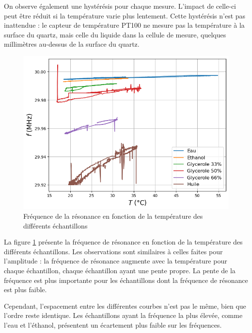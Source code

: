 On observe également une hystérésis pour chaque mesure. L'impact de celle-ci peut être réduit si la température varie plus lentement.  
Cette hystérésis n'est pas inattendue : le capteur de température PT100 ne mesure pas la température à la surface du quartz, mais celle du liquide dans la cellule de mesure, quelques millimètres au-dessus de la surface du quartz.
\newpage
\begin{figure}[H]
    \centering
    \includegraphics[width=\textwidth]{assets/figures/Frequ-Temperature.png}
    \caption{Fréquence de la résonance en fonction de la température des différents échantillons}
    \label{fig:Frequence VS Température}
\end{figure}

La figure \ref{fig:Frequence VS Température} présente la fréquence de résonance en fonction de la température des différents échantillons.  
Les observations sont similaires à celles faites pour l'amplitude : la fréquence de résonance augmente avec la température pour chaque échantillon, chaque échantillon ayant une pente propre.  
La pente de la fréquence est plus importante pour les échantillons dont la fréquence de résonance est plus faible.

Cependant, l'espacement entre les différentes courbes n'est pas le même, bien que l'ordre reste identique.  
Les échantillons ayant la fréquence la plus élevée, comme l'eau et l'éthanol, présentent un écartement plus faible sur les fréquences.


